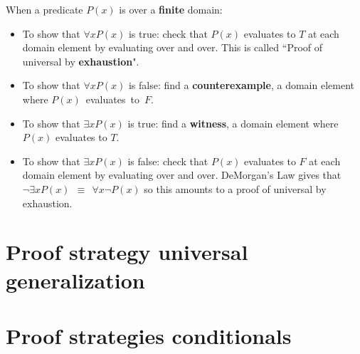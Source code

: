 \documentclass[12pt, oneside]{article}
\begin{document}
When a predicate $P(x)$ is over a {\bf finite} domain:
\begin{itemize}
\item To show that $\forall x  P(x)$ is true: check that $P(x)$ evaluates to $T$ at each domain element by evaluating over and over. 
This is called ``Proof of universal by {\bf exhaustion}".
\item To show that $\forall x  P(x)$ is false: find a {\bf counterexample}, a domain element where $P(x)$~evaluates~to~$F$.
\item To show that $\exists x  P(x)$ is true: find a {\bf witness}, a domain element where $P(x)$ evaluates to $T$.
\item To show that $\exists x  P(x)$ is false: check that $P(x)$ evaluates to $F$ at each domain element by evaluating over and over.
DeMorgan's Law gives that $\lnot \exists x P(x) ~~\equiv~~ \forall x \lnot P(x)$ so this amounts to a proof of universal by exhaustion.
\end{itemize} \vfill
\section*{Proof strategy universal generalization}


 \vfill
\section*{Proof strategies conditionals}



\end{document}

